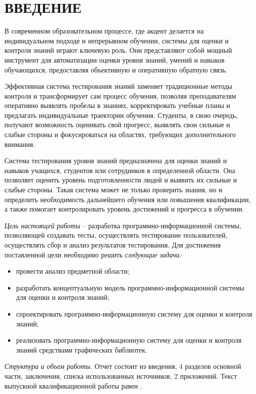 \section*{ВВЕДЕНИЕ}

В современном образовательном процессе, где акцент делается на индивидуальном подходе и непрерывном обучении, системы для оценки и контроля знаний играют ключевую роль. Они представляют собой мощный инструмент для автоматизации оценки уровня знаний, умений и навыков обучающихся, предоставляя объективную и оперативную обратную связь.

Эффективная система тестирования знаний заменяет традиционные методы контроля и трансформирует сам процесс обучения, позволяя преподавателям оперативно выявлять пробелы в знаниях, корректировать учебные планы и предлагать индивидуальные траектории обучения. Студенты, в свою очередь, получают возможность оценивать свой прогресс, выявлять свои сильные и слабые стороны и фокусироваться на областях, требующих дополнительного внимания.

Система тестирования уровня знаний предназначена для оценки знаний и навыков учащихся, студентов или сотрудников в определенной области. Она позволяет оценить уровень подготовленности людей и выявить их сильные и слабые стороны. Такая система может не только проверить знания, но и определить необходимость дальнейшего обучения или повышения квалификации, а также помогает контролировать уровень достижений и прогресса в обучении.

\emph{Цель настоящей работы} – разработка программно-информационной системы, позволяющей создавать тесты, осуществлять тестирование пользователей, осуществлять сбор и анализ результатов тестирования. Для достижения поставленной цели необходимо решить \emph{следующие задачи:}
\begin{itemize}
\item провести анализ предметной области;
\item разработать концептуальную модель программно-информационной системы для оценки и контроля знаний;
\item спроектировать программно-информационную систему для оценки и контроля знаний;
\item реализовать программно-информационную систему для оценки и контроля знаний средствами графических библиотек.
\end{itemize}

\emph{Структура и объем работы.} Отчет состоит из введения, 4 разделов основной части, заключения, списка использованных источников, 2 приложений. Текст выпускной квалификационной работы равен .

